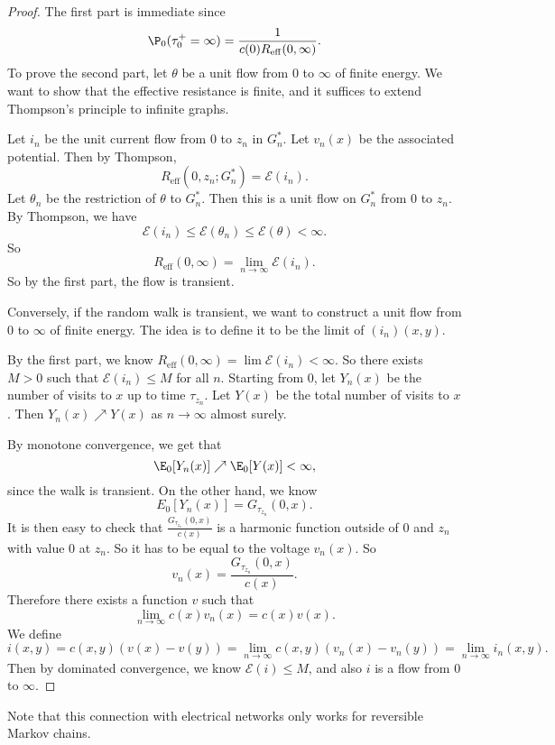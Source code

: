 \documentclass[a4paper]{article}
\begin{document}
\begin{proof}
  The first part is immediate since
  \[
    \P_0(\tau_0^+ = \infty) = \frac{1}{c(0) R_{\mathrm{eff}}(0, \infty)}.
  \]
  To prove the second part, let $\theta$ be a unit flow from $0$ to $\infty$ of finite energy. We want to show that the effective resistance is finite, and it suffices to extend Thompson's principle to infinite graphs.

  Let $i_n$ be the unit current flow from $0$ to $z_n$ in $G_n^*$. Let $v_n(x)$ be the associated potential. Then by Thompson,
  \[
    R_{\mathrm{eff}}(0, z_n; G_n^*) = \mathcal{E}(i_n).
  \]
  Let $\theta_n$ be the restriction of $\theta$ to $G_n^*$. Then this is a unit flow on $G_n^*$ from $0$ to $z_n$. By Thompson, we have
  \[
    \mathcal{E}(i_n) \leq \mathcal{E}(\theta_n) \leq \mathcal{E}(\theta) < \infty.
  \]
  So
  \[
    R_{\mathrm{eff}}(0, \infty) = \lim_{n \to \infty} \mathcal{E}(i_n).
  \]
  So by the first part, the flow is transient.

  Conversely, if the random walk is transient, we want to construct a unit flow from $0$ to $\infty$ of finite energy. The idea is to define it to be the limit of $(i_n)(x, y)$.

  By the first part, we know $R_{\mathrm{eff}}(0, \infty) = \lim \mathcal{E}(i_n) < \infty$. So there exists $M > 0$ such that $\mathcal{E}(i_n) \leq M$ for all $n$. Starting from $0$, let $Y_n(x)$ be the number of visits to $x$ up to time $\tau_{z_n}$. Let $Y(x)$ be the total number of visits to $x$. Then $Y_n(x) \nearrow Y(x)$ as $n \to \infty$ almost surely.

  By monotone convergence, we get that
  \[
    \E_0[Y_n(x)] \nearrow \E_0[Y(x)] < \infty,
  \]
  since the walk is transient. On the other hand, we know
  \[
    E_0[Y_n(x)] = G_{\tau_{z_n}}(0, x).
  \]
  It is then easy to check that $\frac{G_{\tau_{z_n}}(0, x)}{c(x)}$ is a harmonic function outside of $0$ and $z_n$ with value $0$ at $z_n$. So it has to be equal to the voltage $v_n(x)$. So
  \[
    v_n(x) = \frac{G_{\tau_{z_n}}(0, x)}{c(x)}.
  \]
  Therefore there exists a function $v$ such that
  \[
    \lim_{n \to \infty} c(x) v_n(x) = c(x) v(x).
  \]
  We define
  \[
    i(x, y) = c(x, y) (v(x) - v(y)) = \lim_{n \to \infty} c(x, y) (v_n(x) - v_n(y)) = \lim_{n \to \infty} i_n(x, y).
  \]
  Then by dominated convergence, we know $\mathcal{E}(i) \leq M$, and also $i$ is a flow from $0$ to $\infty$.
\end{proof}

Note that this connection with electrical networks only works for reversible Markov chains.
\end{document}
